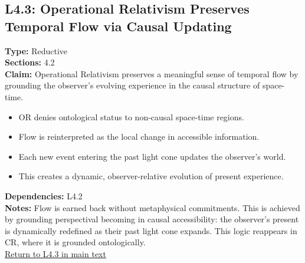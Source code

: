 \documentclass[12pt]{book}
\newcommand{\returnlink}[1]{\hyperref[logic:#1]{Return to #1 in main text}\xspace}
\begin{document}
\subsection*{L4.3: Operational Relativism Preserves Temporal Flow via Causal Updating}\label{appendix:L4.3}
\textbf{Type:} Reductive \\
\textbf{Sections:} 4.2 \\
\textbf{Claim:} Operational Relativism preserves a meaningful sense of temporal flow by grounding the observer's evolving experience in the causal structure of space-time.
\begin{itemize}
  \item OR denies ontological status to non-causal space-time regions.
  \item Flow is reinterpreted as the local change in accessible information.
  \item Each new event entering the past light cone updates the observer's world.
  \item This creates a dynamic, observer-relative evolution of present experience.
\end{itemize}
\textbf{Dependencies:} L4.2 \\
\textbf{Notes:} Flow is earned back without metaphysical commitments. This is achieved by grounding perspectival becoming in causal accessibility: the observer's present is dynamically redefined as their past light cone expands. This logic reappears in CR, where it is grounded ontologically. \\
\returnlink{L4.3}
\end{document}
